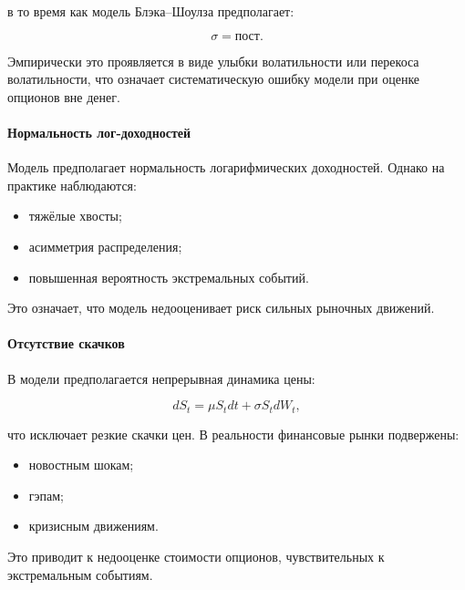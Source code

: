 \documentclass[11pt,a4paper]{article}
\begin{document}
в то время как модель Блэка--Шоулза предполагает:

\begin{equation}
\sigma = \text{пост.}
\end{equation}

Эмпирически это проявляется в виде улыбки волатильности или перекоса волатильности, что означает систематическую ошибку модели при оценке опционов вне денег.

\paragraph{Нормальность лог-доходностей}

Модель предполагает нормальность логарифмических доходностей. Однако на практике наблюдаются:

\begin{itemize}
    \item тяжёлые хвосты;
    
    \item асимметрия распределения;
    
    \item повышенная вероятность экстремальных событий.
\end{itemize}

Это означает, что модель недооценивает риск сильных рыночных движений.

\paragraph{Отсутствие скачков}

В модели предполагается непрерывная динамика цены:

\begin{equation}
dS_t = \mu S_t dt + \sigma S_t dW_t,
\end{equation}

что исключает резкие скачки цен. В реальности финансовые рынки подвержены:

\begin{itemize}
    \item новостным шокам;
    
    \item гэпам;
    
    \item кризисным движениям.
\end{itemize}

Это приводит к недооценке стоимости опционов, чувствительных к экстремальным событиям.
\end{document}
